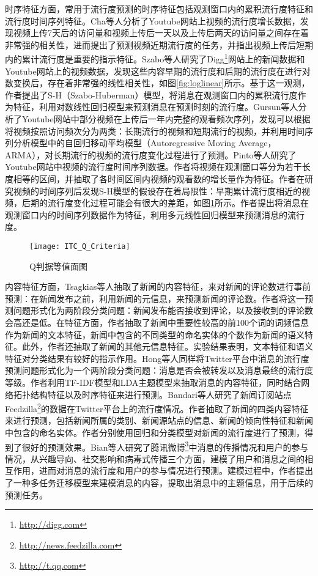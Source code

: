 时序特征方面，常用于流行度预测的时序特征包括观测窗口内的累积流行度特征和流行度时间序列特征。Cha等人\citep{cha2009analyzing}分析了Youtube网站上视频的流行度增长数据，发现视频上传7天后的访问量和视频上传后一天以及上传后两天的访问量之间存在着非常强的相关性，进而提出了预测视频近期流行度的任务，并指出视频上传后短期内的累计流行度是重要的指示特征。Szabo等人\citep{szabo2010predicting}研究了Digg\footnote{\url{http://digg.com}}网站上的新闻数据和Youtube网站上的视频数据，发现这些内容早期的流行度和后期的流行度在进行对数变换后，存在着非常强的线性相关性，如图\ref{fig:loglinear}所示。基于这一观测，作者提出了S-H（Szabo-Huberman）模型，将消息在观测窗口内的累积流行度作为特征，利用对数线性回归模型来预测消息在预测时刻的流行度。Gursun等人\citep{gursun2011describing}分析了Youtube网站中部分视频在上传后一年内完整的观看频次序列，发现可以根据将视频按照访问频次分为两类：长期流行的视频和短期流行的视频，并利用时间序列分析模型中的自回归移动平均模型（Autoregressive Moving Average，ARMA）\citep{marple1987digital}，对长期流行的视频的流行度变化过程进行了预测。Pinto等人\citep{pinto2013using}研究了Youtube网站中视频的流行度时间序列数据。作者将视频在观测窗口等分为若干长度相等的区间，并抽取了各时间区间内视频的观看数的增长量作为特征。作者在研究视频的时间序列后发现S-H模型的假设存在着局限性：早期累计流行度相近的视频，后期的流行度变化过程可能会有很大的差距，如图\ref{fig:pinto}所示。作者提出将消息在观测窗口内的时间序列数据作为特征，利用多元线性回归模型来预测消息的流行度。
\begin{figure}[!htbp]
  \centering
  \texttt{[image: ITC\_Q\_Criteria]}
  \caption{Q判据等值面图}
  \label{fig:pinto}
\end{figure}

内容特征方面，Tsagkias等人\citep{tsagkias2009predicting}抽取了新闻的内容特征，来对新闻的评论数进行事前预测：在新闻发布之前，利用新闻的元信息，来预测新闻的评论数。作者将这一预测问题形式化为两阶段分类问题：新闻发布能否接收到评论，以及接收到的评论数会高还是低。在特征方面，作者抽取了新闻中重要性较高的前100个词的词频信息作为新闻的文本特征，新闻中包含的不同类型的命名实体的个数作为新闻的语义特征。此外，作者还抽取了新闻的其他元信息特征。实验结果表明，文本特征和语义特征对分类结果有较好的指示作用。Hong等人\citep{hong2011predicting}同样将Twitter平台中消息的流行度预测问题形式化为一个两阶段分类问题：消息是否会被转发以及消息最终的流行度等级。作者利用TF-IDF模型和LDA主题模型\citep{blei2003latent}来抽取消息的内容特征，同时结合网络拓扑结构特征以及时序特征来进行预测。Bandari等人\citep{bandari2012pulse}研究了新闻订阅站点Feedzilla\footnote{\url{http://news.feedzilla.com}}的数据在Twitter平台上的流行度情况。作者抽取了新闻的四类内容特征来进行预测，包括新闻所属的类别、新闻源站点的信息、新闻的倾向性特征和新闻中包含的命名实体。作者分别使用回归和分类模型对新闻的流行度进行了预测，得到了很好的预测效果。Bian等人\citep{bian2014predicting}研究了腾讯微博\footnote{\url{http://t.qq.com}}中消息的传播情况和用户的参与情况，从兴趣导向、社交影响和病毒式传播三个方面，建模了用户和消息之间的相互作用，进而对消息的流行度和用户的参与情况进行预测。建模过程中，作者提出了一种多任务迁移模型来建模消息的内容，提取出消息中的主题信息，用于后续的预测任务。

